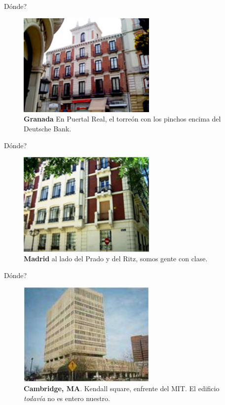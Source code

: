 \documentclass[12pt,compress]{beamer}
\begin{document}
\begin{frame}{Dónde?}

\begin{figure}[htbp]
\centering
\includegraphics[width=0.60000\textwidth]{images/granada.jpg}
\caption{\textbf{Granada} En Puertal Real, el torreón con los pinchos
encima del Deutsche Bank.}
\end{figure}

\end{frame}

\begin{frame}{Dónde?}

\begin{figure}[htbp]
\centering
\includegraphics[width=0.60000\textwidth]{images/madrid.png}
\caption{\textbf{Madrid} al lado del Prado y del Ritz, somos gente con
clase.}
\end{figure}

\end{frame}

\begin{frame}{Dónde?}

\begin{figure}[htbp]
\centering
\includegraphics[width=0.60000\textwidth]{images/boston.jpg}
\caption{\textbf{Cambridge, MA}. Kendall square, enfrente del MIT. El
edificio \emph{todavía} no es entero nuestro.}
\end{figure}

\end{frame}
\end{document}
